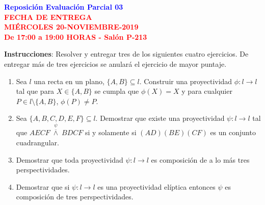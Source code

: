 \documentclass[12pt]{report}
\numberwithin{section}{chapter}
\begin{document}
\begin{center}
\textcolor{blue}{\textbf{\large Reposición Evaluación Parcial 03}}\\
\vspace{0.5 cm}
\textcolor{red}{\textbf{\large FECHA DE ENTREGA \\ MIÉRCOLES 20-NOVIEMBRE-2019\\ De 17:00 a 19:00 HORAS - Salón P-213}}
\end{center}

\textbf{Instrucciones}: Resolver y entregar tres de los siguientes cuatro ejercicios. De entregar más de tres ejercicios se anulará el ejercicio de mayor puntaje.

\begin{enumerate}
\item Sea $l$ una recta en un plano, $\{A,B\} \subseteq l$. Construir una proyectividad $\phi:l \to l$ tal que para $X \in \{A,B\}$ se cumpla que $\phi(X)=X$ y para cualquier $P \in l \setminus\{A,B\}$, $\phi(P) \neq P$.

\item Sea $\{A,B,C,D,E,F\} \subseteq l$. Demostrar que existe una proyectividad $\psi:l \to l$ tal que \linebreak $AECF\;\overset{\psi}{\overline{\wedge}}\; BDCF$ si y solamente si $(AD)(BE)(CF)$ es un conjunto cuadrangular.

\item Demostrar que toda proyectividad $\psi:l \to l$ es composición de a lo más tres perspectividades.

\item Demostrar que si $\psi:l \to l$ es una proyectividad elíptica entonces $\psi$ es composición de tres perspectividades.

\end{enumerate}
\end{document}

